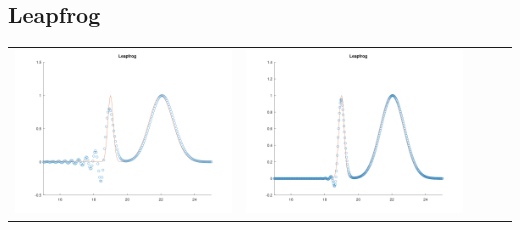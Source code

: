 \documentclass{article}
\begin{document}
\subsection{Leapfrog}
\begin{table}[h]
    \centering
        \begin{tabular}{ccccc}
            \includegraphics[scale = 0.17]{Leapfrog.png} & \includegraphics[scale = 0.17]{Leapfrog2.png} \\

\end{tabular}
\end{table}
\end{document}
